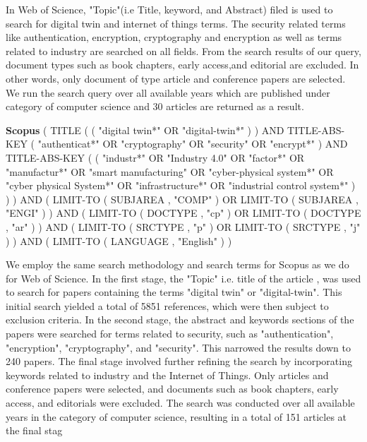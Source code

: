 In Web of Science, "Topic"(i.e Title, keyword, and Abstract) filed is used to search for digital twin and internet of things terms. The security related terms like authentication, encryption, cryptography and encryption as well as terms related to industry are searched on all fields. From the search results of our query, document types such as book chapters, early access,and editorial are excluded. In other words, only document of type article and conference papers are selected. We run the search query over all available years which are published under category of computer science and 30 articles are returned as a result.
\begin{tcolorbox}[colback=black!5!white, sharp corners=all, colframe=white!95!black]
\textbf{Scopus}
\tcblower
( TITLE ( ( "digital twin*" OR "digital-twin*" ) ) AND TITLE-ABS-KEY ( "authenticat*" OR "cryptography" OR "security" OR "encrypt*" ) AND TITLE-ABS-KEY ( ( "industr*" OR "Industry 4.0" OR "factor*" OR "manufactur*" OR "smart manufacturing" OR "cyber-physical system*" OR "cyber physical System*" OR "infrastructure*" OR "industrial control system*" ) ) ) AND ( LIMIT-TO ( SUBJAREA , "COMP" ) OR LIMIT-TO ( SUBJAREA , "ENGI" ) ) AND ( LIMIT-TO ( DOCTYPE , "cp" ) OR LIMIT-TO ( DOCTYPE , "ar" ) ) AND ( LIMIT-TO ( SRCTYPE , "p" ) OR LIMIT-TO ( SRCTYPE , "j" ) ) AND ( LIMIT-TO ( LANGUAGE , "English" ) )
\end{tcolorbox}
We employ the same search methodology and search terms for Scopus as we do for Web of Science. In the first stage, the "Topic" i.e. title of the article , was used to search for papers containing the terms "digital twin" or "digital-twin". This initial search yielded a total of 5851 references, which were then subject to exclusion criteria. In the second stage, the abstract and keywords sections of the papers were searched for terms related to security, such as "authentication", "encryption", "cryptography", and "security". This narrowed the results down to 240 papers. The final stage involved further refining the search by incorporating keywords related to industry and the Internet of Things. Only articles and conference papers were selected, and documents such as book chapters, early access, and editorials were excluded. The search was conducted over all available years in the category of computer science, resulting in a total of 151 articles at the final stag 

